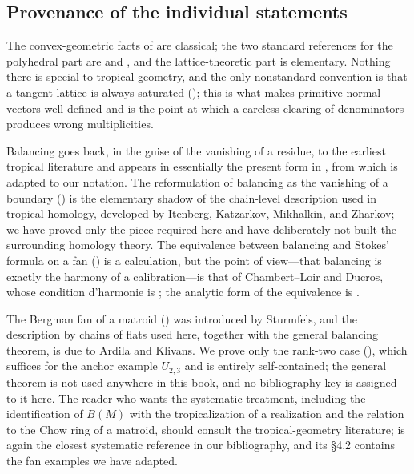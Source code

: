 \subsection*{Provenance of the individual statements}

The convex-geometric facts of  are classical; the
two standard references for the polyhedral part are \cite{Roc70} and
\cite{Sch14}, and the lattice-theoretic part is elementary.  Nothing there is
special to tropical geometry, and the only nonstandard convention is that a
tangent lattice is always saturated
(); this is what makes primitive normal
vectors well defined and is the point at which a careless clearing of
denominators produces wrong multiplicities.

Balancing goes back, in the guise of the vanishing of a residue, to the
earliest tropical literature and appears in essentially the present form in
\cite[\S4.2]{MR18Tropical}, from which  is
adapted to our notation. The reformulation of balancing as the vanishing of a
boundary () is the elementary shadow of the
chain-level description used in tropical homology, developed by Itenberg,
Katzarkov, Mikhalkin, and Zharkov; we have proved only the piece required
here and have deliberately not built the surrounding homology theory.  The
equivalence between balancing and Stokes' formula on a fan
() is a calculation, but the point of
view---that balancing is exactly the harmony of a calibration---is that of
Chambert--Loir and Ducros, whose condition d'harmonie is
\cite[Theorem~6.6.8 and \S15.6]{CLD25}; the analytic form of the equivalence
is .

The Bergman fan of a matroid () was introduced by
Sturmfels, and the description by chains of flats used here, together with
the general balancing theorem, is due to Ardila and Klivans.  We prove only
the rank-two case (), which suffices for the
anchor example $U_{2,3}$ and is entirely self-contained; the general theorem
is not used anywhere in this book, and no bibliography key is assigned to it
here.  The reader who wants the systematic treatment, including the
identification of $B(M)$ with the tropicalization of a realization and the
relation to the Chow ring of a matroid, should consult the tropical-geometry
literature; \cite{MR18Tropical} is again the closest systematic reference in
our bibliography, and its \S4.2 contains the fan examples we have adapted.


